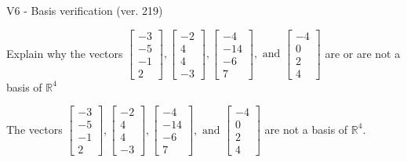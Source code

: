 \begin{exercise}
  \begin{exerciseTitle}V6 - Basis verification (ver. 219)\end{exerciseTitle}
  \begin{exerciseStatement}
    Explain why the vectors \(\left[\begin{array}{r}
-3 \\
-5 \\
-1 \\
2
\end{array}\right] , \left[\begin{array}{r}
-2 \\
4 \\
4 \\
-3
\end{array}\right] , \left[\begin{array}{r}
-4 \\
-14 \\
-6 \\
7
\end{array}\right] , \text{ and } \left[\begin{array}{r}
-4 \\
0 \\
2 \\
4
\end{array}\right]\) are or are not a basis of \(\mathbb{R}^4\)	


  \end{exerciseStatement}
  \begin{exerciseAnswer}
   The vectors \(\left[\begin{array}{r}
-3 \\
-5 \\
-1 \\
2
\end{array}\right] , \left[\begin{array}{r}
-2 \\
4 \\
4 \\
-3
\end{array}\right] , \left[\begin{array}{r}
-4 \\
-14 \\
-6 \\
7
\end{array}\right] , \text{ and } \left[\begin{array}{r}
-4 \\
0 \\
2 \\
4
\end{array}\right]\) 
  	 are not  a basis of \(\mathbb{R}^4\).
  


  \end{exerciseAnswer}
\end{exercise}